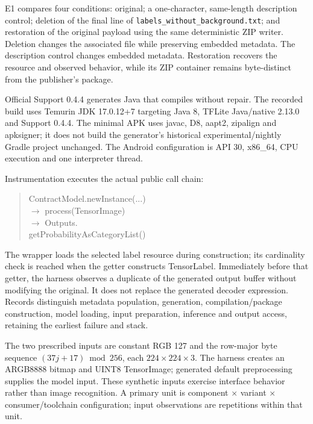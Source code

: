 \documentclass[10pt,conference]{IEEEtran}
\newcommand{\code}[1]{\texttt{#1}}
\begin{document}
E1 compares four conditions: original; a one-character, same-length description control; deletion of the final line of \code{labels\_without\_background.txt}; and restoration of the original payload using the same deterministic ZIP writer. Deletion changes the associated file while preserving embedded metadata. The description control changes embedded metadata. Restoration recovers the resource and observed behavior, while its ZIP container remains byte-distinct from the publisher's package.

Official Support 0.4.4 generates Java that compiles without repair. The recorded build uses Temurin JDK 17.0.12+7 targeting Java 8, TFLite Java/native 2.13.0 and Support 0.4.4. The minimal APK uses javac, D8, aapt2, zipalign and apksigner; it does not build the generator's historical experimental/nightly Gradle project unchanged. The Android configuration is API 30, x86\_64, CPU execution and one interpreter thread.

Instrumentation executes the actual public call chain:
\begin{quote}\small\ttfamily\raggedright
ContractModel.newInstance(...)\\
\quad\(\rightarrow\) process(TensorImage)\\
\quad\(\rightarrow\) Outputs.\\
\hspace*{1.4em}getProbabilityAsCategoryList()
\end{quote}
The wrapper loads the selected label resource during construction; its cardinality check is reached when the getter constructs TensorLabel. Immediately before that getter, the harness observes a duplicate of the generated output buffer without modifying the original. It does not replace the generated decoder expression. Records distinguish metadata population, generation, compilation/package construction, model loading, input preparation, inference and output access, retaining the earliest failure and stack.

The two prescribed inputs are constant RGB 127 and the row-major byte sequence $(37j+17)\bmod256$, each $224\times224\times3$. The harness creates an ARGB8888 bitmap and UINT8 TensorImage; generated default preprocessing supplies the model input. These synthetic inputs exercise interface behavior rather than image recognition. A primary unit is component $\times$ variant $\times$ consumer/toolchain configuration; input observations are repetitions within that unit.
\end{document}
